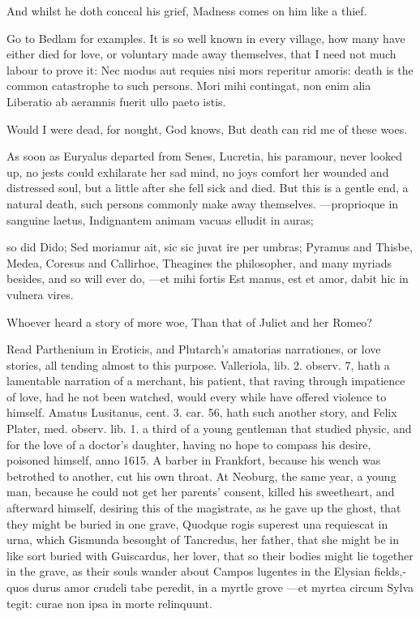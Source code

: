 {And whilst he doth conceal his grief,
Madness comes on him like a thief.

Go to Bedlam for examples. It is so well known in every village, how
many have either died for love, or voluntary made away themselves, that
I need not much labour to prove it: Nec modus aut requies nisi
mors reperitur amoris: death is the common catastrophe to such persons.
Mori mihi contingat, non enim alia
Liberatio ab aeramnis fuerit ullo paeto istis.

Would I were dead, for nought, God knows,
But death can rid me of these woes.

As soon as Euryalus departed from Senes, Lucretia, his paramour, never
looked up, no jests could exhilarate her sad mind, no joys comfort her
wounded and distressed soul, but a little after she fell sick and died.
But this is a gentle end, a natural death, such persons commonly make
away themselves.
---proprioque in sanguine laetus,
Indignantem animam vacuas elludit in auras;

so did Dido; Sed moriamur ait, sic sic juvat ire per umbras; 
Pyramus and Thisbe, Medea, Coresus and Callirhoe, Theagines
the philosopher, and many myriads besides, and so will ever do,
---et mihi fortis
Est manus, est et amor, dabit hic in vulnera vires.

Whoever heard a story of more woe,
Than that of Juliet and her Romeo?

Read Parthenium in Eroticis, and Plutarch's amatorias narrationes, or
love stories, all tending almost to this purpose. Valleriola, lib. 2.
observ. 7, hath a lamentable narration of a merchant, his patient,
 that raving through impatience of love, had he not been watched,
would every while have offered violence to himself. Amatus Lusitanus,
cent. 3. car. 56, hath such another story, and Felix Plater, med.
observ. lib. 1. a third of a young gentleman that studied physic,
and for the love of a doctor's daughter, having no hope to compass his
desire, poisoned himself, anno 1615. A barber in Frankfort,
because his wench was betrothed to another, cut his own throat.
At Neoburg, the same year, a young man, because he could not get
her parents' consent, killed his sweetheart, and afterward himself,
desiring this of the magistrate, as he gave up the ghost, that they
might be buried in one grave, Quodque rogis superest una requiescat in
urna, which  Gismunda besought of Tancredus, her father, that she
might be in like sort buried with Guiscardus, her lover, that so their
bodies might lie together in the grave, as their souls wander about
Campos lugentes in the Elysian fields,-quos durus amor crudeli
tabe peredit, in a myrtle grove
---et myrtea circum
Sylva tegit: curae non ipsa in morte relinquunt.

}
